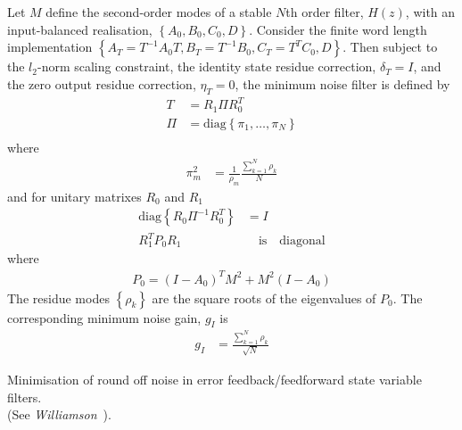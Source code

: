 \documentclass[a4paper,twoside,10pt,english]{report}
\begin{document}
\begin{algorithm}[!htbp]
Let $M$ define the second-order modes of a stable $N$th order filter,
$H\left(z\right)$, with an input-balanced realisation, 
$\left\{A_{0},B_{0},C_{0},D\right\}$. Consider the finite word length 
implementation 
$\left\{A_{T}=T^{-1}A_{0}T,B_{T}=T^{-1}B_{0},C_{T}=T^{T}C_{0},D\right\}$. Then 
subject to the $l_{2}$-norm scaling constraint, the identity state residue
correction, $\delta_{T}=I$, and the zero output residue correction,
$\eta_{T}=0$, the minimum noise filter is defined by
\begin{align*}
T &= R_{1}\Pi R_{0}^{T}\\
\Pi &= \text{diag}\left\{ \pi_{1},\ldots,\pi_{N}\right\}\\
\end{align*}
where
\begin{align*}
\pi_{m}^{2} &= \frac{1}{\rho_{m}}\frac{\sum_{k=1}^{N}\rho_{k}}{N}
\end{align*}
and for unitary matrixes $R_{0}$ and $R_{1}$
\begin{align*}
\text{diag}\left\{R_{0}\Pi^{-1}R_{0}^{T}\right\}&=I\\
R_{1}^{T}P_{0}R_{1} & \quad\text{is}\quad\text{diagonal}
\end{align*}
where
\begin{align*}
P_{0}=\left(I-A_{0}\right)^{T}M^{2}+M^{2}\left(I-A_{0}\right)
\end{align*}
The residue modes $\left\{\rho_{k}\right\}$ are the square roots of the
eigenvalues of $P_{0}$. The corresponding minimum noise gain, $g_{I}$ is
\begin{align*}
g_{I}&=\frac{\sum_{k=1}^{N}\rho_{k}}{\sqrt{N}}
\end{align*}
\caption{Minimisation of round off noise in error feedback/feedforward state variable filters. \\
(See \emph{Williamson}~\cite[Theorem 5.2]
{Williamson_RoundoffNoiseMinimizationUsingResidueFeedback}).}
\label{alg:Minimisation-of-round-off-noise-in-error-feedback-feedforward-state-variable-filters}
\end{algorithm}
\end{document}
